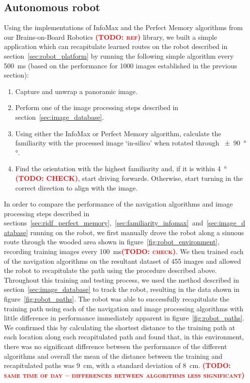 \documentclass[letterpaper]{article}
\newcommand{\todo}[1]{\textbf{\textsc{\textcolor{red}{(TODO: #1)}}}}
\begin{document}
\subsection{Autonomous robot}
Using the implementations of InfoMax and the Perfect Memory algorithms from our Brains-on-Board Robotics \todo{ref} library, we built a simple application which can recapitulate learned routes on the robot described in section~\ref{sec:robot_platform} by running the following simple algorithm every \SI{500}{\milli\second} (based on the performance for 1000 images established in the previous section):
%
\begin{enumerate}
    \item Capture and unwrap a panoramic image.
    \item Perform one of the image processing steps described in section~\ref{sec:image_database}.
    \item Using either the InfoMax or Perfect Memory algorithm, calculate the familiarity with the processed image ‘in-silico’ when rotated through \SI{\pm 90}{\degree}°.
    \item Find the orientation with the highest familiarity and, if it is within \SI{4}{\degree} \todo{CHECK}, start driving forwards. Otherwise, start turning in the correct direction to align with the image.
\end{enumerate}
%
In order to compare the performance of the navigation algorithms and image processing steps described in sections~\ref{sec:ridf_perfect_memory},~\ref{sec:familiarity_infomax}~and~\ref{sec:image_database} running on the robot, we first manually drove the robot along a sinuous route through the wooded area shown in figure~\ref{fig:robot_environment}, recording training images every \SI{100}{\milli\second}\todo{check}.
We then trained each of the navigation algorithms on the resultant dataset of \num{455} images and allowed the robot to recapitulate the path using the procedure described above.
Throughout this training and testing process, we used the method described in section~\ref{sec:image_database} to track the robot, resulting in the data shown in figure~\ref{fig:robot_paths}.
The robot was able to successfully recapitulate the training path using each of the navigation and image processing algorithms with little difference in performance immediately apparent in figure~\ref{fig:robot_paths}.
We confirmed this by calculating the shortest distance to the training path at each location along each recapitulated path and found that, in this environment, there was no significant difference between the performance of the different algorithms and overall the mean of the distance between the training and recapitulated paths was \SI{9}{\centi\metre}, with a standard deviation of \SI{8}{\centi\metre}.
\todo{same time of day -- differences between algorithms less significant}
\end{document}
